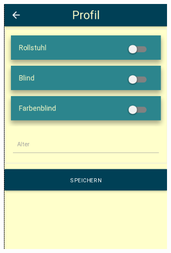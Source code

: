 \begin{figure}[ht]
\begin{minipage}[b]{.5\textwidth}
  \includegraphics[width=.8\linewidth]{img/profil.png}
  \label{img:profil-first-draft}
\end{minipage}
\begin{flushleft}
\begin{minipage}[b]{.5\textwidth}
  \centering

\end{minipage}
\end{flushleft}
\end{figure}
